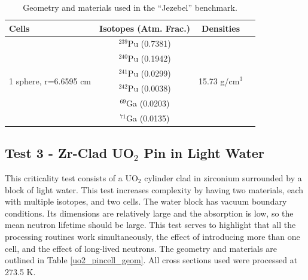 \documentclass[preprint,12pt]{elsarticle}
\begin{document}
\begin{table}[h]
\centering
\caption{Geometry and materials used in the ``Jezebel'' benchmark.}
\label{jezebel_geom}
\begin{tabular}{| l | c | c | c |}
\hline
Cells & Isotopes (Atm. Frac.)& Densities \\
\hline
\multirow{6}{*}{1 sphere, r=6.6595 cm }  &  $^{239}$Pu (0.7381) &    \multirow{6}{*}{15.73 g/cm$^3$} \\
                                         &  $^{240}$Pu (0.1942)    & \\
                                         &  $^{241}$Pu (0.0299)    & \\
                                         &  $^{242}$Pu (0.0038)    & \\
                                         &  $^{69}$Ga  (0.0203)    & \\
                                         &  $^{71}$Ga  (0.0135)     & \\ 
\hline
\end{tabular}
\end{table}


\subsection{Test 3 - Zr-Clad UO$_2$ Pin in Light Water}

This criticality test consists of a UO$_2$ cylinder clad in zirconium surrounded by a block of light water.  This test increases complexity by having two materials, each with multiple isotopes, and two cells.  The water block has vacuum boundary conditions.  Its dimensions are relatively large and the absorption is low, so the mean neutron lifetime should be large.  This test serves to highlight that all the processing routines work simultaneously, the effect of introducing more than one cell, and the effect of long-lived neutrons.  The geometry and materials are outlined in Table \ref{uo2_pincell_geom}.  All cross sections used were processed at 273.5 K.
\end{document}
